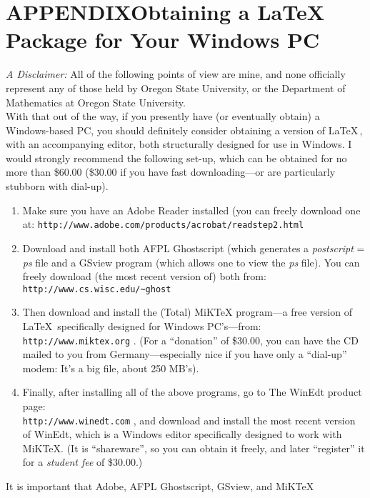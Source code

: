 \documentclass[11pt]{gthesis2}  %
\begin{document}
\section{APPENDIX\;\;\;Obtaining a \LaTeX\,Package for Your Windows PC}
\label{sec: }
%
%
%
\emph{A Disclaimer:} All of the following points of view are mine,
and none officially represent any of those held by Oregon State
University, or the Department of Mathematics at Oregon State
University.
\\
\indent With that out of the way, if you presently have (or
eventually obtain) a Windows-based PC, you should definitely
consider obtaining a version of \LaTeX\,, with an accompanying
editor, both structurally designed for use in Windows. I would
strongly recommend the following set-up, which can be obtained for
no more than \$60.00 (\$30.00 if you have fast downloading---or
are particularly stubborn with dial-up).
%
\begin{enumerate}
    \item Make sure you have an Adobe Reader installed
    (you can freely download one at:
    \texttt{http://www.adobe.com/products/acrobat/readstep2.html}
    \item Download and install both AFPL Ghostscript (which generates a
    \emph{postscript} = \emph{ps} file
     and a GSview program (which allows one to view the \emph{ps} file).
     You can freely download (the most recent version of) both from:
     \texttt{http://www.cs.wisc.edu/\~{}ghost}
    \item Then download and install the (Total) MiKTeX program---a
    free version of \LaTeX\, specifically designed for Windows
    PC's---from: \texttt{http://www.miktex.org} . (For a ``donation'' of
    \$30.00, you can have the CD mailed to you from Germany---especially nice
     if you have only a ``dial-up'' modem: It's a big file, about 250 MB's).
    \item Finally, after installing all of the above programs, go to The
    WinEdt product
    page: \\ \texttt{http://www.winedt.com} , and download and install the
    most recent
    version of WinEdt, which is a Windows editor specifically
    designed to work with MiKTeX. (It is ``shareware'', so you
    can obtain it freely, and later ``register'' it for a
    \emph{student fee} of \$30.00.)
\end{enumerate}
%
It is important that Adobe, AFPL Ghostscript, GSview, and MiKTeX
\end{document}
